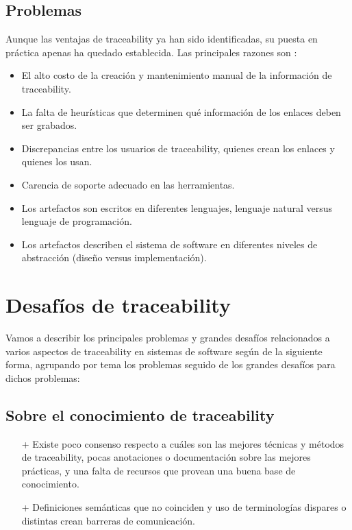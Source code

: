 \documentclass[a4paper,12pt,oneside]{book}
\begin{document}
\subsection{Problemas}

Aunque las ventajas de traceability ya han sido identificadas, su puesta en práctica apenas ha quedado establecida. Las principales razones son \cite{GrammelVoigt}:

\begin{itemize}

 \item   El alto     costo de la creación y mantenimiento manual de la información de     traceability.

\item    La falta de heurísticas que determinen qué información de los enlaces deben ser grabados.

 \item   Discrepancias     entre los usuarios de traceability, quienes crean los enlaces y quienes los usan.

\item    Carencia de soporte adecuado en las herramientas.

\item    Los artefactos son escritos en diferentes lenguajes, lenguaje natural versus lenguaje de programación.

\item    Los artefactos describen el sistema de software en diferentes niveles de abstracción (diseño versus implementación).
\end{itemize}

\section{Desafíos de traceability}

Vamos a describir los principales problemas y grandes desafíos relacionados a varios aspectos de traceability en sistemas de software según \cite{Excellence} de la siguiente forma, agrupando por tema los problemas seguido de los grandes desafíos para dichos problemas:

\subsection{Sobre el conocimiento de traceability}

\begin{itemize}
\item[+]    Existe poco consenso respecto a cuáles son las mejores técnicas y métodos de traceability, pocas anotaciones o documentación sobre las mejores prácticas, y una falta de recursos que provean una buena base de conocimiento.
\item[+]    Definiciones semánticas que no coinciden y uso de terminologías dispares o distintas crean barreras de comunicación.
\end{itemize}
\end{document}
